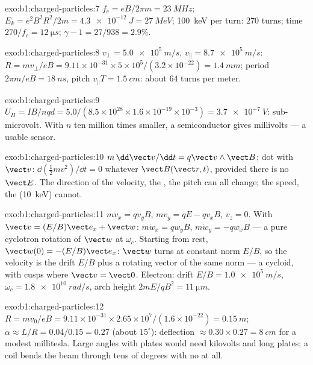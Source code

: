 \begin{solution}{exo:b1:charged-particles:7}
$f_c = eB/2\pi m = \qty{23}{MHz}$; $E_k = e^2B^2R^2/2m = \qty{4.3e-12}{J} =
\qty{27}{MeV}$; \qty{100}{keV} per turn: $270$ turns; time $270/f_c =
\qty{12}{\micro s}$; $\gamma - 1 = 27/938 = 2.9\%$.
\end{solution}

\begin{solution}{exo:b1:charged-particles:8}
$v_\perp = \qty{5.0e5}{m/s}$, $v_\parallel = \qty{8.7e5}{m/s}$: $R = mv_\perp/eB
= 9.11\times10^{-31} \times 5\times10^5/(3.2\times10^{-22}) = \qty{1.4}{mm}$;
period $2\pi m/eB = \qty{18}{ns}$, pitch $v_\parallel T = \qty{1.5}{cm}$:
about $64$ turns per meter.
\end{solution}

\begin{solution}{exo:b1:charged-particles:9}
$U_H = IB/nqd = 5.0/(8.5\times10^{28} \times 1.6\times10^{-19} \times 10^{-3})
= \qty{3.7e-7}{V}$: sub-microvolt. With $n$ ten million times smaller, a
semiconductor gives millivolts --- a usable sensor.
\end{solution}

\begin{solution}{exo:b1:charged-particles:10}
$m\,\dd\vect v/\dd t = q\vect v\wedge\vect B$; dot with $\vect v$: $\dd(\tfrac12 mv^2)/
\dd t = 0$ whatever $\vect B(\vect r, t)$, provided there is no $\vect E$. The
direction of the velocity, the , the pitch can all
change; the speed, the  (\qty{10}{keV}) cannot.
\end{solution}

\begin{solution}{exo:b1:charged-particles:11}
$m\dot v_x = qv_yB$, $m\dot v_y = qE - qv_xB$, $v_z = 0$. With $\vect v =
(E/B)\vect e_x + \vect w$: $m\dot w_x = qw_yB$, $m\dot w_y = -qw_xB$ --- a
pure cyclotron rotation of $\vect w$ at $\omega_c$. Starting from rest,
$\vect w(0) = -(E/B)\vect e_x$: $\vect w$ turns at constant norm $E/B$, so the
velocity is the drift $E/B$ plus a rotating vector of the same norm ---
a cycloid, with cusps where $\vect v = \vect 0$. Electron: drift $E/B =
\qty{1.0e5}{m/s}$, $\omega_c = \qty{1.8e10}{rad/s}$, arch height $2mE/qB^2 =
\qty{11}{\micro m}$.
\end{solution}

\begin{solution}{exo:b1:charged-particles:12}
$R = mv_0/eB = 9.11\times10^{-31} \times 2.65\times10^7/(1.6\times10^{-22}) =
\qty{0.15}{m}$; $\alpha \approx L/R = 0.04/0.15 = 0.27$ (about $15^\circ$):
deflection $\approx 0.30 \times 0.27 = \qty{8}{cm}$ for a modest
millitesla. Large angles with plates would need kilovolts and long
plates; a coil bends the beam through tens of degrees with no 
at all.
\end{solution}

